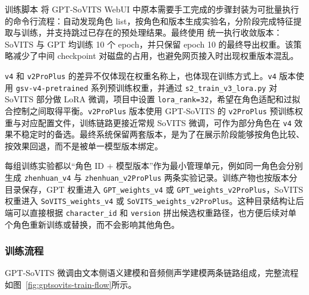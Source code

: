 \documentclass[12pt,a4paper]{article}
\begin{document}
训练脚本  将 GPT-SoVITS WebUI 中原本需要手工完成的步骤封装为可批量执行的命令行流程：自动发现角色 list，按角色和版本生成实验名，分阶段完成特征提取与训练，并支持跳过已存在的预处理结果。最终使用  统一执行收敛版本：SoVITS 与 GPT 均训练 10 个 epoch，并只保留 epoch 10 的最终导出权重。该策略减少了中间 checkpoint 对磁盘的占用，也避免网页接入时出现权重版本混乱。

\texttt{v4} 和 \texttt{v2ProPlus} 的差异不仅体现在权重名称上，也体现在训练方式上。\texttt{v4} 版本使用 \texttt{gsv-v4-pretrained} 系列预训练权重，并通过 \texttt{s2\_train\_v3\_lora.py} 对 SoVITS 部分做 LoRA 微调，项目中设置 \texttt{lora\_rank=32}，希望在角色适配和过拟合控制之间取得平衡。\texttt{v2ProPlus} 版本使用 GPT-SoVITS 的 \texttt{v2ProPlus} 预训练权重与对应配置文件，训练链路更接近常规 SoVITS 微调，可作为部分角色在 \texttt{v4} 效果不稳定时的备选。最终系统保留两套版本，是为了在展示阶段能够按角色比较、按效果回退，而不是被单一模型版本绑定。

每组训练实验都以“角色 ID + 模型版本”作为最小管理单元，例如同一角色会分别生成 \texttt{zhenhuan\_v4} 与 \texttt{zhenhuan\_v2ProPlus} 两条实验记录。训练产物也按版本分目录保存，GPT 权重进入 \texttt{GPT\_weights\_v4} 或 \texttt{GPT\_weights\_v2ProPlus}，SoVITS 权重进入 \texttt{SoVITS\_weights\_v4} 或 \texttt{SoVITS\_weights\_v2ProPlus}。这种目录结构让后端可以直接根据 \texttt{character\_id} 和 \texttt{version} 拼出候选权重路径，也方便后续对单个角色重新训练或替换，而不会影响其他角色。

\subsubsection{训练流程}

GPT-SoVITS 微调由文本侧语义建模和音频侧声学建模两条链路组成，完整流程如图~\ref{fig:gptsovits-train-flow}所示。
\end{document}
